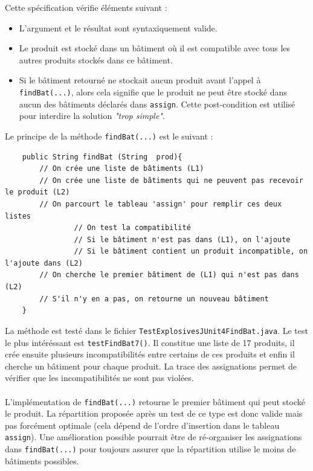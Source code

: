\documentclass{article}
\begin{document}
\noindent
Cette spécification vérifie éléments suivant :
\begin{itemize}
\item L'argument et le résultat sont syntaxiquement valide.
\item Le produit est stocké dans un bâtiment où il est compatible avec tous les autres produits stockés dans ce bâtiment.
\item Si le bâtiment retourné ne stockait aucun produit avant l'appel à \texttt{findBat(...)}, alors cela signifie que le produit ne peut être stocké dans aucun des bâtiments déclarés dans \texttt{assign}. Cette post-condition est utilisé pour interdire la solution \textit{"trop simple"}.
\end{itemize}

\newpage

Le principe de la méthode \texttt{findBat(...)} est le suivant :

\vspace{0.2cm}
\noindent
\begin{verbatim}
    public String findBat (String  prod){
        // On crée une liste de bâtiments (L1)
        // On crée une liste de bâtiments qui ne peuvent pas recevoir le produit (L2)
        // On parcourt le tableau 'assign' pour remplir ces deux listes
                // On test la compatibilité
                // Si le bâtiment n'est pas dans (L1), on l'ajoute
                // Si le bâtiment contient un produit incompatible, on l'ajoute dans (L2)
        // On cherche le premier bâtiment de (L1) qui n'est pas dans (L2)
        // S'il n'y en a pas, on retourne un nouveau bâtiment
    }
\end{verbatim}
\vspace{0.2cm}

La méthode est testé dans le fichier \texttt{TestExplosivesJUnit4FindBat.java}. Le test le plus intéréssant est \texttt{testFindBat7()}. Il constitue une liste de 17 produits, il crée ensuite plusieurs incompatibilités entre certains de ces produits et enfin il cherche un bâtiment pour chaque produit. La trace des assignations permet de vérifier que les incompatibilités ne sont pas violées.

\paragraph{\danger} L'implémentation de \texttt{findBat(...)} retourne le premier bâtiment qui peut stocké le produit. La répartition proposée après un test de ce type est donc valide mais pas forcément optimale (cela dépend de l'ordre d'insertion dans le tableau \texttt{assign}). Une amélioration possible pourrait être de ré-organiser les assignations dans \texttt{findBat(...)} pour toujours assurer que la répartition utilise le moins de bâtiments possibles.
\end{document}

